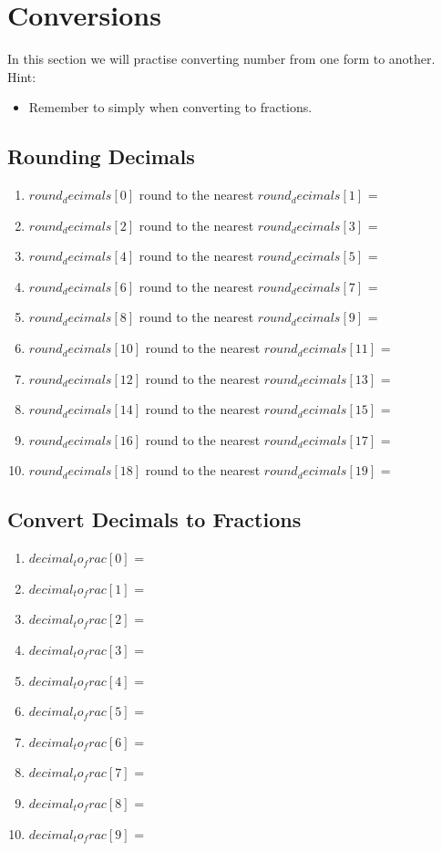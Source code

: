 \documentclass[11pt]{article}
\begin{document}
\clearpage

\section{Conversions}
In this section we will practise converting number from one form to another. \\
Hint:
\begin{itemize}
	\item Remember to simply when converting to fractions.
\end{itemize}
\subsection{Rounding Decimals}
\begin{enumerate}
	\item ${{ round_decimals[0] }}$ round to the nearest ${{ round_decimals[1] }}$ = 
	\item ${{ round_decimals[2] }}$ round to the nearest ${{ round_decimals[3] }}$ = 
	\item ${{ round_decimals[4] }}$ round to the nearest ${{ round_decimals[5] }}$ = 
	\item ${{ round_decimals[6] }}$ round to the nearest ${{ round_decimals[7] }}$ = 
	\item ${{ round_decimals[8] }}$ round to the nearest ${{ round_decimals[9] }}$ = 
	\item ${{ round_decimals[10] }}$ round to the nearest ${{ round_decimals[11] }}$ = 
	\item ${{ round_decimals[12] }}$ round to the nearest ${{ round_decimals[13] }}$ = 
	\item ${{ round_decimals[14] }}$ round to the nearest ${{ round_decimals[15] }}$ = 
	\item ${{ round_decimals[16] }}$ round to the nearest ${{ round_decimals[17] }}$ = 
	\item ${{ round_decimals[18] }}$ round to the nearest ${{ round_decimals[19] }}$ = 
\end{enumerate}

\subsection{Convert Decimals to Fractions}
\begin{enumerate}
	\item ${{ decimal_to_frac[0] }}$ = 
	\item ${{ decimal_to_frac[1] }}$ = 
	\item ${{ decimal_to_frac[2] }}$ = 
	\item ${{ decimal_to_frac[3] }}$ = 
	\item ${{ decimal_to_frac[4] }}$ = 
	\item ${{ decimal_to_frac[5] }}$ = 
	\item ${{ decimal_to_frac[6] }}$ = 
	\item ${{ decimal_to_frac[7] }}$ = 
	\item ${{ decimal_to_frac[8] }}$ = 
	\item ${{ decimal_to_frac[9] }}$ = 
\end{enumerate}
\end{document}

